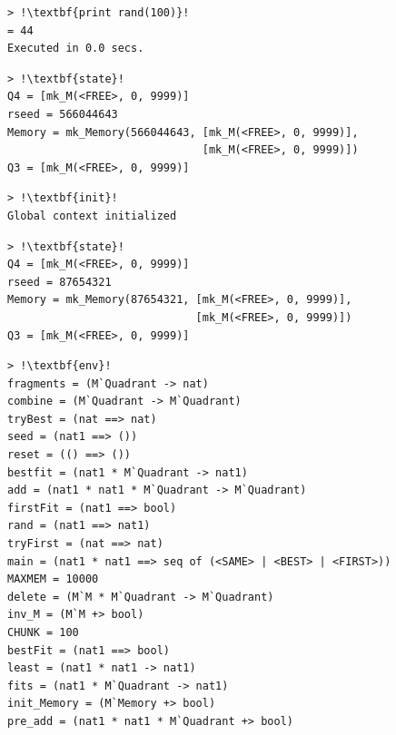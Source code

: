 \documentclass{overturerepchap}
\begin{document}
\begin{lstlisting}
> !\textbf{print rand(100)}!
= 44
Executed in 0.0 secs.
\end{lstlisting}

\begin{lstlisting}
> !\textbf{state}!
Q4 = [mk_M(<FREE>, 0, 9999)]
rseed = 566044643
Memory = mk_Memory(566044643, [mk_M(<FREE>, 0, 9999)],
                              [mk_M(<FREE>, 0, 9999)])
Q3 = [mk_M(<FREE>, 0, 9999)]
\end{lstlisting}

\begin{lstlisting}
> !\textbf{init}!
Global context initialized
\end{lstlisting}

\begin{lstlisting}
> !\textbf{state}!
Q4 = [mk_M(<FREE>, 0, 9999)]
rseed = 87654321
Memory = mk_Memory(87654321, [mk_M(<FREE>, 0, 9999)],
                             [mk_M(<FREE>, 0, 9999)])
Q3 = [mk_M(<FREE>, 0, 9999)]
\end{lstlisting}



\begin{lstlisting}
> !\textbf{env}!
fragments = (M`Quadrant -> nat)
combine = (M`Quadrant -> M`Quadrant)
tryBest = (nat ==> nat)
seed = (nat1 ==> ())
reset = (() ==> ())
bestfit = (nat1 * M`Quadrant -> nat1)
add = (nat1 * nat1 * M`Quadrant -> M`Quadrant)
firstFit = (nat1 ==> bool)
rand = (nat1 ==> nat1)
tryFirst = (nat ==> nat)
main = (nat1 * nat1 ==> seq of (<SAME> | <BEST> | <FIRST>))
MAXMEM = 10000
delete = (M`M * M`Quadrant -> M`Quadrant)
inv_M = (M`M +> bool)
CHUNK = 100
bestFit = (nat1 ==> bool)
least = (nat1 * nat1 -> nat1)
fits = (nat1 * M`Quadrant -> nat1)
init_Memory = (M`Memory +> bool)
pre_add = (nat1 * nat1 * M`Quadrant +> bool)
\end{lstlisting}

\end{document}
